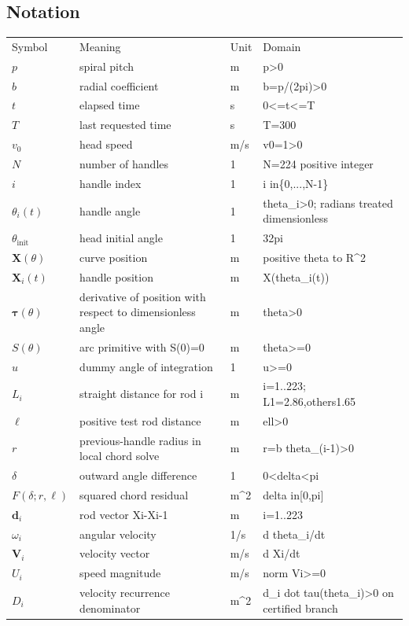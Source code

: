 \subsection*{Notation}
\begin{tabular}{llll}
Symbol & Meaning & Unit & Domain \\
$p$ & spiral pitch & m & p>0 \\
$b$ & radial coefficient & m & b=p/(2pi)>0 \\
$t$ & elapsed time & s & 0<=t<=T \\
$T$ & last requested time & s & T=300 \\
$v_0$ & head speed & m/s & v0=1>0 \\
$N$ & number of handles & 1 & N=224 positive integer \\
$i$ & handle index & 1 & i in\{0,...,N-1\} \\
$\theta_i(t)$ & handle angle & 1 & theta\_i>0; radians treated dimensionless \\
$\theta_{\mathrm{init}}$ & head initial angle & 1 & 32pi \\
$\mathbf X(\theta)$ & curve position & m & positive theta to R^2 \\
$\mathbf X_i(t)$ & handle position & m & X(theta\_i(t)) \\
$\boldsymbol\tau(\theta)$ & derivative of position with respect to dimensionless angle & m & theta>0 \\
$S(\theta)$ & arc primitive with S(0)=0 & m & theta>=0 \\
$u$ & dummy angle of integration & 1 & u>=0 \\
$L_i$ & straight distance for rod i & m & i=1..223; L1=2.86,others1.65 \\
$\ell$ & positive test rod distance & m & ell>0 \\
$r$ & previous-handle radius in local chord solve & m & r=b theta\_(i-1)>0 \\
$\delta$ & outward angle difference & 1 & 0<delta<pi \\
$F(\delta;r,\ell)$ & squared chord residual & m^2 & delta in[0,pi] \\
$\mathbf d_i$ & rod vector Xi-Xi-1 & m & i=1..223 \\
$\omega_i$ & angular velocity & 1/s & d theta\_i/dt \\
$\mathbf V_i$ & velocity vector & m/s & d Xi/dt \\
$U_i$ & speed magnitude & m/s & norm Vi>=0 \\
$D_i$ & velocity recurrence denominator & m^2 & d\_i dot tau(theta\_i)>0 on certified branch \\
\end{tabular}
